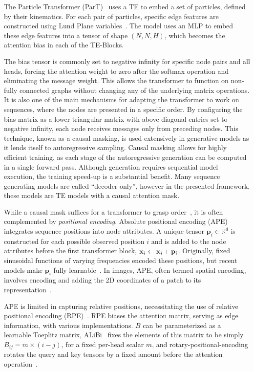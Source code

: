 The Particle Transformer (ParT)~\cite{ParticleTransformerJet} uses a TE to embed a set of particles, defined by their kinematics.
For each pair of particles, specific edge features are constructed using Lund Plane variables~\cite{LundJetPlane}.
The model uses an MLP to embed these edge features into a tensor of shape $(N, N, H)$, which becomes the attention bias in each of the TE-Blocks.

The bias tensor is commonly set to negative infinity for specific node pairs and all heads, forcing the attention weight to zero after the softmax operation and eliminating the message weight. This allows the transformer to function on non-fully connected graphs without changing any of the underlying matrix operations.
It is also one of the main mechanisms for adapting the transformer to work on sequences, where the nodes are presented in a specific order.
By configuring the bias matrix as a lower triangular matrix with above-diagonal entries set to negative infinity, each node receives messages only from preceding nodes.
This technique, known as a causal masking, is used extensively in generative models as it lends itself to autoregressive sampling.
Causal masking allows for highly efficient training, as each stage of the autoregressive generation can be computed in a single forward pass.
Although generation requires sequential model execution, the training speed-up is a substantial benefit.
Many sequence generating models are called ``decoder only'', however in the presented framework, these models are TE models with a causal attention mask.

While a causal mask suffices for a transformer to grasp order~\cite{TransformerLanguageModels}, it is often complemented by \textit{positional encoding}.
Absolute positional encoding (APE) integrates sequence positions into node attributes.
A unique tensor $\mathbf{p}_i \in \mathbb{R}^{d}$ is constructed for each possible observed position $i$ and is added to the node attributes before the first transformer block, $\mathbf{x}_i \leftarrow \mathbf{x}_i + \mathbf{p}_i$.
Originally, fixed sinusoidal functions of varying frequencies encoded these positions, but recent models make $\mathbf{p}_i$ fully learnable~\cite{GPT}.
In images, APE, often termed spatial encoding, involves encoding and adding the 2D coordinates of a patch to its representation~\cite{VisionTransformer}.

APE is limited in capturing relative positions, necessitating the use of relative positional encoding (RPE)~\cite{SelfAttentionRelativePosition}.
RPE biases the attention matrix, serving as edge information, with various implementations.
$B$ can be parameterized as a learnable Toeplitz matrix, ALiBi~\cite{ALIBI} fixes the elements of this matrix to be simply $B_{ij} = m\times(i - j)$, for a fixed per-head scalar $m$, and rotary-positional-encoding rotates the query and key tensors by a fixed amount before the attention operation~\cite{RoFormerEnhancedTransformer}.

